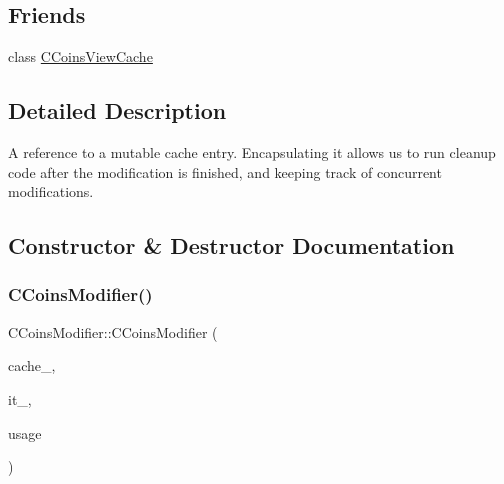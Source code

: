 \subsection*{Friends}
\begin{DoxyCompactItemize}
\item 
class \mbox{\hyperlink{class_c_coins_modifier_a1a8530a17e2e3f56e97217784400ee46}{C\+Coins\+View\+Cache}}
\end{DoxyCompactItemize}


\subsection{Detailed Description}
A reference to a mutable cache entry. Encapsulating it allows us to run cleanup code after the modification is finished, and keeping track of concurrent modifications. 

\subsection{Constructor \& Destructor Documentation}
\mbox{\label{class_c_coins_modifier_af4b52a789d194cf57497a36d1e5287d3}} 
\subsubsection{\texorpdfstring{C\+Coins\+Modifier()}{CCoinsModifier()}}
{\footnotesize\ttfamily C\+Coins\+Modifier\+::\+C\+Coins\+Modifier (\begin{DoxyParamCaption}\item[{\mbox{\hyperlink{class_c_coins_view_cache}{C\+Coins\+View\+Cache}} \&}]{cache\+\_\+,  }\item[{C\+Coins\+Map\+::iterator}]{it\+\_\+,  }\item[{size\+\_\+t}]{usage }\end{DoxyParamCaption})\hspace{0.3cm}{\ttfamily [private]}}

\mbox{\label{class_c_coins_modifier_aacb75869fd2cabec97645eb46f42e98b}} 
